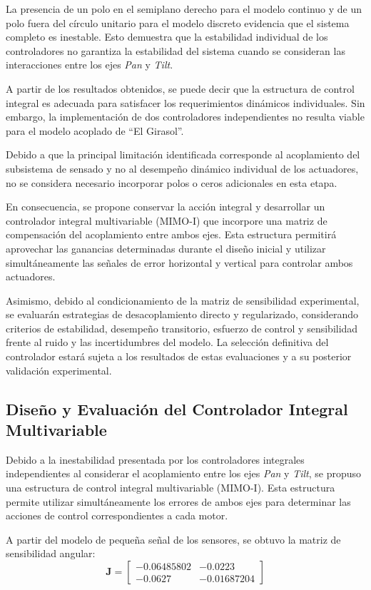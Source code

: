 \documentclass[12pt,a4paper]{article}
\begin{document}
La presencia de un polo en el semiplano derecho para el modelo continuo y de un polo fuera del círculo unitario para el modelo discreto evidencia que el sistema completo es inestable. Esto demuestra que la estabilidad individual de los controladores no garantiza la estabilidad del sistema cuando se consideran las interacciones entre los ejes \emph{Pan} y \emph{Tilt}.

A partir de los resultados obtenidos, se puede decir que la estructura de control integral es adecuada para satisfacer los requerimientos dinámicos individuales. Sin embargo, la implementación de dos controladores independientes no resulta viable para el modelo acoplado de ``El Girasol''.

Debido a que la principal limitación identificada corresponde al acoplamiento del subsistema de sensado y no al desempeño dinámico individual de los actuadores, no se considera necesario incorporar polos o ceros adicionales en esta etapa.

En consecuencia, se propone conservar la acción integral y desarrollar un controlador integral multivariable (MIMO-I) que incorpore una matriz de compensación del acoplamiento entre ambos ejes. Esta estructura permitirá aprovechar las ganancias determinadas durante el diseño inicial y utilizar simultáneamente las señales de error horizontal y vertical para controlar ambos actuadores.

Asimismo, debido al condicionamiento de la matriz de sensibilidad experimental, se evaluarán estrategias de desacoplamiento directo y regularizado, considerando criterios de estabilidad, desempeño transitorio, esfuerzo de control y sensibilidad frente al ruido y las incertidumbres del modelo. La selección definitiva del controlador estará sujeta a los resultados de estas evaluaciones y a su posterior validación experimental.

\subsection{Diseño y Evaluación del Controlador Integral Multivariable}
Debido a la inestabilidad presentada por los controladores integrales independientes al considerar el acoplamiento entre los ejes \emph{Pan} y \emph{Tilt}, se propuso una estructura de control integral multivariable (MIMO-I). Esta estructura permite utilizar simultáneamente los errores de ambos ejes para determinar las acciones de control correspondientes a cada motor.

A partir del modelo de pequeña señal de los sensores, se obtuvo la matriz de sensibilidad angular:
\begin{equation}
\mathbf{J} = \begin{bmatrix} -0.06485802 & -0.0223 \\ -0.0627 & -0.01687204 \end{bmatrix}
\end{equation}
\end{document}
